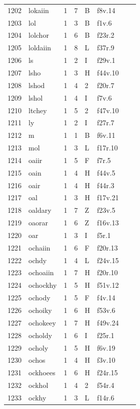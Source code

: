 \documentclass[11pt,a4paper]{article}
\begin{document}
\begin{landscape}
\begin{longtable}{@{}r>{\ttfamily}lrrl>{\ttfamily}l>{\raggedright\arraybackslash}p{80mm}>{\raggedright\arraybackslash}p{36mm}@{}}
1202 & lokaiin & 1 & 7 & B & f8v.14 &  & \\
1203 & lol & 1 & 3 & B & f1v.6 &  & \\
1204 & lolchor & 1 & 6 & B & f23r.2 &  & \\
1205 & loldaiin & 1 & 8 & L & f37r.9 &  & \\
1206 & ls & 1 & 2 & I & f29v.1 &  & \\
1207 & lsho & 1 & 3 & H & f44v.10 &  & \\
1208 & lshod & 1 & 4 & 2 & f20r.7 &  & \\
1209 & lshol & 1 & 4 & I & f7v.6 &  & \\
1210 & ltchey & 1 & 5 & 2 & f47v.10 &  & \\
1211 & ly & 1 & 2 & I & f27r.7 &  & \\
1212 & m & 1 & 1 & B & f6v.11 &  & \\
1213 & mol & 1 & 3 & L & f17r.10 &  & \\
1214 & oaiir & 1 & 5 & F & f7r.5 &  & \\
1215 & oain & 1 & 4 & H & f44v.5 &  & \\
1216 & oair & 1 & 4 & H & f44r.3 &  & \\
1217 & oal & 1 & 3 & H & f17v.21 &  & \\
1218 & oaldary & 1 & 7 & Z & f23v.5 &  & \\
1219 & oaorar & 1 & 6 & Z & f16v.13 &  & \\
1220 & oar & 1 & 3 & I & f5r.1 &  & \\
1221 & ochaiin & 1 & 6 & F & f20r.13 &  & \\
1222 & ochdy & 1 & 4 & L & f24v.15 &  & \\
1223 & ochoaiin & 1 & 7 & H & f20r.10 &  & \\
1224 & ochockhy & 1 & 5 & H & f51v.12 &  & \\
1225 & ochody & 1 & 5 & F & f4v.14 &  & \\
1226 & ochoiky & 1 & 6 & H & f53v.6 &  & \\
1227 & ochokeey & 1 & 7 & H & f49v.24 &  & \\
1228 & ocholdy & 1 & 6 & I & f25r.1 &  & \\
1229 & ocholy & 1 & 5 & H & f6v.19 &  & \\
1230 & ochos & 1 & 4 & H & f3v.10 &  & \\
1231 & ockhoees & 1 & 6 & H & f24r.15 &  & \\
1232 & ockhol & 1 & 4 & 2 & f54r.4 &  & \\
1233 & ockhy & 1 & 3 & L & f14r.6 &  & \\

\end{longtable}
\end{landscape}
\end{document}
